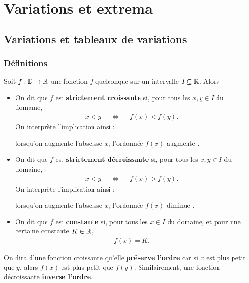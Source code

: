 \documentclass[a4paper, 12pt]{report}
\begin{document}
\chapter{Variations et extrema}

\section{Variations et tableaux de variations}

\subsection{Définitions}

\begin{defn}
	Soit $f : \mathbb{D} \rightarrow \mathbb{R}$ une fonction $f$ quelconque sur un intervalle $I\subseteq\mathbb{R}$.
	Alors
		\begin{itemize}
			\item On dit que $f$ est \textbf{strictement croissante} si, pour tous les $x,y\in I$ du domaine,
				\begin{align*}
					x < y && \iff && f(x) < f(y).
				\end{align*}	
			On interprète l'implication ainsi :
			\begin{center}
				\og lorsqu'on augmente l'abscisse $x$, l'ordonnée $f(x)$ augmente \fg.
			\end{center}
				
			\item On dit que $f$ est \textbf{strictement décroissante} si, pour tous les $x,y\in I$ du domaine,
				\begin{align*}
					x < y && \iff && f(x) > f(y).
				\end{align*}
			On interprète l'implication ainsi :
			\begin{center}
				\og lorsqu'on augmente l'abscisse $x$, l'ordonnée $f(x)$ diminue \fg.
			\end{center}
				
			\item On dit que $f$ est \textbf{constante} si, pour tous les $x\in I$ du domaine, et pour une certaine constante $K\in\mathbb{R}$,
				\begin{align*}
					f(x) = K.
				\end{align*}
		\end{itemize}
\end{defn}

\begin{rmq}
	On dira d'une fonction croissante qu'elle \textbf{préserve l'ordre} car si $x$ est plus petit que $y$, alors $f(x)$ est plus petit que $f(y)$.
	Similairement, une fonction décroissante \textbf{inverse l'ordre}.
\end{rmq}
\end{document}
